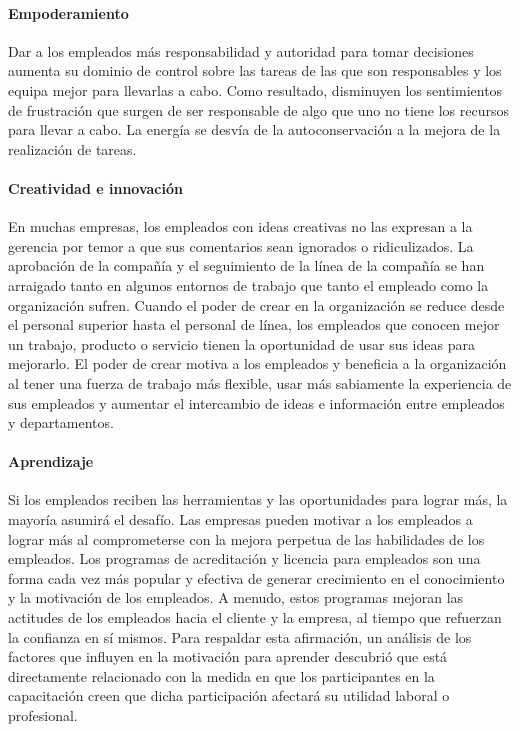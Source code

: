\documentclass[10pt]{book}
\begin{document}
\paragraph{Empoderamiento} Dar a los empleados más responsabilidad y autoridad para tomar decisiones aumenta su dominio de control sobre las tareas de las que son responsables y los equipa mejor para llevarlas a cabo. Como resultado, disminuyen los sentimientos de frustración que surgen de ser responsable de algo que uno no tiene los recursos para llevar a cabo. La energía se desvía de la autoconservación a la mejora de la realización de tareas.\\
\paragraph{Creatividad e innovación} En muchas empresas, los empleados con ideas creativas no las expresan a la gerencia por temor a que sus comentarios sean ignorados o ridiculizados. La aprobación de la compañía y el seguimiento de la línea de la compañía se han arraigado tanto en algunos entornos de trabajo que tanto el empleado como la organización sufren. Cuando el poder de crear en la organización se reduce desde el personal superior hasta el personal de línea, los empleados que conocen mejor un trabajo, producto o servicio tienen la oportunidad de usar sus ideas para mejorarlo. El poder de crear motiva a los empleados y beneficia a la organización al tener una fuerza de trabajo más flexible, usar más sabiamente la experiencia de sus empleados y aumentar el intercambio de ideas e información entre empleados y departamentos.\\
\paragraph{Aprendizaje}Si los empleados reciben las herramientas y las oportunidades para lograr más, la mayoría asumirá el desafío. Las empresas pueden motivar a los empleados a lograr más al comprometerse con la mejora perpetua de las habilidades de los empleados. Los programas de acreditación y licencia para empleados son una forma cada vez más popular y efectiva de generar crecimiento en el conocimiento y la motivación de los empleados. A menudo, estos programas mejoran las actitudes de los empleados hacia el cliente y la empresa, al tiempo que refuerzan la confianza en sí mismos. Para respaldar esta afirmación, un análisis de los factores que influyen en la motivación para aprender descubrió que está directamente relacionado con la medida en que los participantes en la capacitación creen que dicha participación afectará su utilidad laboral o profesional.\\
\end{document}
